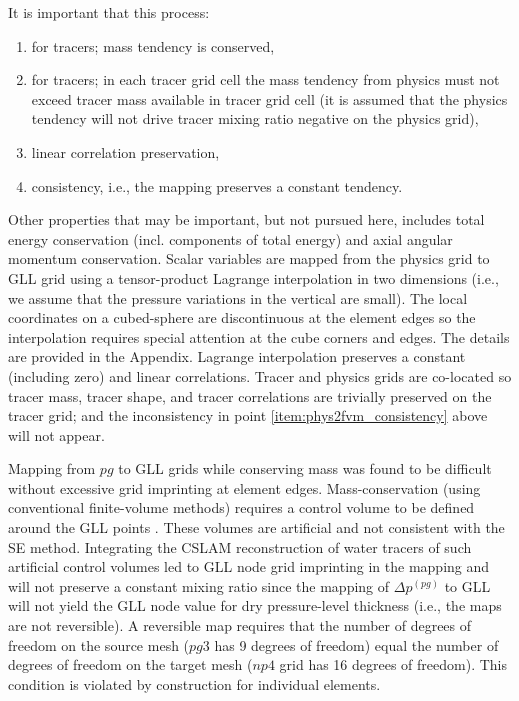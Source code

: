 \documentclass{ametsoc}
\begin{document}
It is important that this process:
\begin{enumerate}
\item for tracers; mass tendency is conserved,
\item for tracers; in each tracer grid cell the mass tendency from physics must not exceed tracer mass available in tracer grid cell (it is assumed that the physics tendency will not drive tracer mixing ratio negative on the physics grid),\label{item:phys2fvm_consistency}
\item linear correlation preservation,
\item consistency, i.e., the mapping preserves a constant tendency.
\end{enumerate}
Other properties that may be important, but not pursued here, includes total energy conservation (incl. components of total energy) and axial angular momentum conservation. Scalar variables are mapped from the physics grid to GLL grid using a tensor-product Lagrange interpolation in two dimensions (i.e., we assume that the pressure variations in the vertical are small). The local coordinates on a cubed-sphere are discontinuous at the element edges so the interpolation requires special attention at the cube corners and edges. The details are provided in the Appendix. Lagrange interpolation preserves a constant (including zero) and linear correlations. Tracer and physics grids are co-located so tracer mass, tracer shape, and tracer correlations are trivially preserved on the tracer grid; and the inconsistency in point \ref{item:phys2fvm_consistency} above will not appear. 

Mapping from $pg$ to GLL grids while conserving mass was found to be difficult without excessive grid imprinting at element edges. Mass-conservation (using conventional finite-volume methods) requires a control volume to be defined around the GLL points \cite[see Figure \ref{fig:cv-grids} in this paper or Figure 8b in ][]{UDJ2016MWR}. These volumes are artificial and not consistent with the SE method. Integrating the CSLAM reconstruction of water tracers of such artificial control volumes led to GLL node grid imprinting in the mapping and will not preserve a constant mixing ratio since the mapping of $\Delta p^{(pg)}$ to GLL will not yield the GLL node value for dry pressure-level thickness (i.e., the maps are not reversible).  A reversible map requires that the number of degrees of freedom on the source mesh ($pg3$ has 9 degrees of freedom) equal the number of degrees of freedom on the target mesh ($np4$ grid has 16 degrees of freedom). This condition is violated by construction for individual elements.
\end{document}
